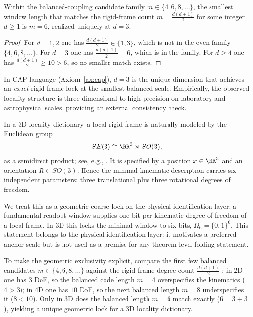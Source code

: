 \begin{proposition}\label{prop:cap_dim_lock}
Within the balanced-coupling candidate family $m\in\{4,6,8,\dots\}$, the smallest window length that matches the rigid-frame count $m=\frac{d(d+1)}{2}$ for some integer $d\ge 1$ is $m=6$, realized uniquely at $d=3$.
\end{proposition}
\begin{proof}
For $d=1,2$ one has $\frac{d(d+1)}{2}\in\{1,3\}$, which is not in the even family $\{4,6,8,\dots\}$.
For $d=3$ one has $\frac{d(d+1)}{2}=6$, which is in the family.
For $d\ge 4$ one has $\frac{d(d+1)}{2}\ge 10>6$, so no smaller match exists.
\end{proof}
In CAP language (Axiom~\ref{ax:cap}), $d=3$ is the unique dimension that achieves an \emph{exact} rigid-frame lock at the smallest balanced scale.
Empirically, the observed locality structure is three-dimensional to high precision on laboratory and astrophysical scales, providing an external consistency check.

In a $3$D locality dictionary, a local rigid frame is naturally modeled by the Euclidean group
\[
SE(3)\cong \RR^3\rtimes SO(3),
\]
as a semidirect product; see, e.g., \cite{HallLieGroups2015}.
It is specified by a position $x\in\RR^3$ and an orientation $R\in SO(3)$.
Hence the minimal kinematic description carries six independent parameters: three translational plus three rotational degrees of freedom.

We treat this as a geometric coarse-lock on the physical identification layer: a fundamental readout window supplies one bit per kinematic degree of freedom of a local frame.
In $3$D this locks the minimal window to six bits, $\Omega_6=\{0,1\}^6$.
This statement belongs to the physical identification layer: it motivates a preferred anchor scale but is not used as a premise for any theorem-level folding statement.

To make the geometric exclusivity explicit, compare the first few balanced candidates $m\in\{4,6,8,\dots\}$ against the rigid-frame degree count $\frac{d(d+1)}{2}$ \cite{HallLieGroups2015}:
in $2$D one has $3$ DoF, so the balanced code length $m=4$ overspecifies the kinematics ($4>3$); in $4$D one has $10$ DoF, so the next balanced length $m=8$ underspecifies it ($8<10$).
Only in $3$D does the balanced length $m=6$ match exactly ($6=3+3$), yielding a unique geometric lock for a $3$D locality dictionary.

